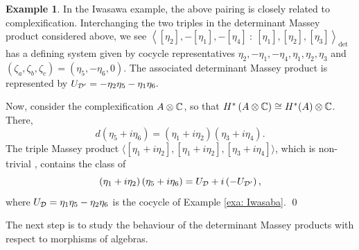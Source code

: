 \documentclass[11pt]{article}
\theoremstyle{definition}
\newtheorem{example}[theorem]{Example}
\theoremstyle{definition}
\begin{document}
\begin{example}
In the Iwasawa example, the above pairing is closely related to complexification.  
Interchanging the two triples in the determinant Massey product considered above, 
we see $\left\langle [\eta_2],-[\eta_1],-[\eta_4] \ :\ [\eta_1],[\eta_2],[\eta_3] \right\rangle_{\det}$
has a defining system given by cocycle representatives
$\eta_2,-\eta_1,-\eta_4, \eta_1,\eta_2,\eta_3$
and $(\zeta_a,\zeta_b,\zeta_c)
=(\eta_5,-\eta_6,0).$
The associated determinant Massey product is represented by $U_{\mathcal D'}=-\eta_2\eta_5-\eta_1\eta_6.$

Now, consider the complexification $A\otimes \mathbb{C}$,
so that $H^*\left(A \otimes \mathbb{C}\right) \cong H^*(A)\otimes \mathbb{C}$. 
There, 
\begin{equation*}
d\left(\eta_5+i\eta_6\right) = (\eta_1+i\eta_2)(\eta_3+i\eta_4 ).
\end{equation*}  
The triple Massey product 
$\langle [\eta_1+i\eta_2], [\eta_1+i\eta_2],  [\eta_3+i\eta_4] \rangle$, 
which is non-trivial \cite{Mili24},
contains the class of 
\begin{equation*}
\left(\eta_1 +i \eta_2\right)\left(\eta_5 + i \eta_6\right) = U_\mathcal D + i\left(-U_{\mathcal D'}\right),
\end{equation*}
where $U_\mathcal D = \eta_1\eta_5-\eta_2\eta_6$ is the cocycle of Example \ref{exa: Iwasaba}.
\qed
\end{example}

The next step is to study the behaviour of the determinant Massey products with respect to morphisms of algebras.
\end{document}
